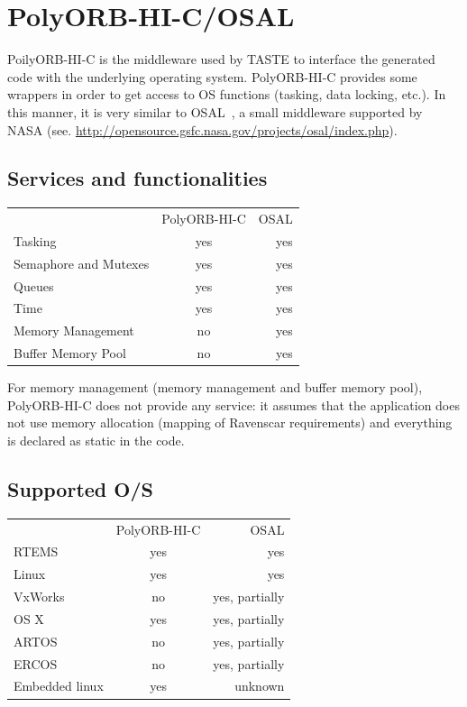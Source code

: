 \documentclass[11pt]{book}
\begin{document}
{      \section{PolyORB-HI-C/OSAL}
      PoilyORB-HI-C is the middleware used by TASTE to interface the generated
      code with the underlying operating system. PolyORB-HI-C  provides some
      wrappers in order to get access to OS functions (tasking, data locking,
      etc.). In this manner, it is very similar to OSAL~\cite{Oliver:2010:OSA:1774088.1774243}, a small middleware
      supported by NASA (see.
      \url{http://opensource.gsfc.nasa.gov/projects/osal/index.php}).

         \subsection{Services and functionalities}
         \begin{tabular}{ l c r }
            & PolyORB-HI-C & OSAL \\
           Tasking & yes & yes  \\
           Semaphore and Mutexes & yes & yes \\
           Queues & yes & yes \\
           Time & yes & yes \\
           Memory Management & no & yes \\
           Buffer Memory Pool & no & yes \\
         \end{tabular}

         For memory management (memory management and buffer memory pool),
         PolyORB-HI-C does not provide any service: it assumes that the
         application does not use memory allocation (mapping of Ravenscar
         requirements) and everything is declared as static in the code.

         \subsection{Supported O/S}
         \begin{tabular}{ l c r }
            & PolyORB-HI-C & OSAL \\
           RTEMS & yes & yes  \\
           Linux & yes & yes \\
           VxWorks & no & yes, partially \\
           OS X & yes & yes, partially \\
           ARTOS & no & yes, partially \\
           ERCOS & no & yes, partially \\
           Embedded linux & yes & unknown \\
         \end{tabular}

}
\end{document}
